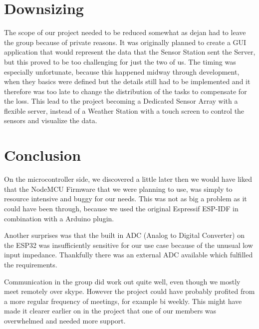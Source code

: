 \section{Downsizing}
The scope of our project needed to be reduced somewhat as dejan had to leave the group because of private reasons.
It was originally planned to create a GUI application that would represent the data that the Sensor Station sent the Server, but this proved to be too challenging for just the two of us.
The timing was especially unfortunate, because this happened midway through development, when they basics were defined but the details still had to be implemented and it therefore was too late to change the distribution of the tasks to compensate for the loss.
This lead to the project becoming a Dedicated Sensor Array with a flexible server, instead of a Weather Station with a touch screen to control the sensors and visualize the data.

\section{Conclusion}
On the microcontroller side, we discovered a little later then we would have liked that the NodeMCU Firmware that we were planning to use, was simply to resource intensive and buggy for our needs. This was not as big a problem as it could have been through, because we used the original Espressif ESP-IDF in combination with a Arduino plugin.

Another surprises was that the built in ADC (Analog to Digital Converter) on the ESP32 was insufficiently sensitive for our use case because of the unusual low input impedance. Thankfully there was an external ADC available which fulfilled the requirements.

Communication in the group did work out quite well, even though we mostly meet remotely over skype. However the project could have probably profited from a more regular frequency of meetings, for example bi weekly. This might have made it clearer earlier on in the project that one of our members was overwhelmed and needed more support.
\newpage
